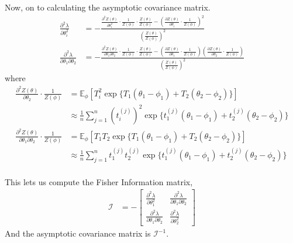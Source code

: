 \documentclass[11pt]{article}
\newcommand{\E}{\mathbb{E}}
\begin{document}
\begin{enumerate}
\begin{enumerate}
Now, on to calculating the asymptotic covariance matrix.
\begin{align*}
	\frac{\partial^2 \lambda}{\partial \theta_i^2} &= - \frac{ \frac{\partial^2 Z(\theta)}{\partial \theta_i^2} \cdot \frac{1}{Z(\phi)} \cdot \frac{Z(\theta)}{Z(\phi)} - \left(\frac{\partial Z(\theta)}{\partial \theta_i} \cdot \frac{1}{Z(\phi)}\right)^2 }{\left(\frac{Z(\theta)}{Z(\phi)}\right)^2} \\
	\frac{\partial^2 \lambda}{\partial \theta_1 \partial \theta_2} &= - \frac{ \frac{\partial^2 Z(\theta)}{\partial \theta_1 \partial \theta_2} \cdot \frac{1}{Z(\phi)} \cdot \frac{Z(\theta)}{Z(\phi)} - \left(\frac{\partial Z(\theta)}{\partial \theta_1} \cdot \frac{1}{Z(\phi)}\right) \left(\frac{\partial Z(\theta)}{\partial \theta_2} \cdot \frac{1}{Z(\phi)}\right) }{\left(\frac{Z(\theta)}{Z(\phi)}\right)^2}
\end{align*}
where
\begin{align*}
	\frac{\partial^2 Z(\theta)}{\partial \theta_2} \cdot \frac{1}{Z(\phi)} &= \E_{\phi} \left[ T_i^2 \exp\{T_1(\theta_1 - \phi_1) + T_2(\theta_2 - \phi_2)\} \right] \\
	&\approx \frac{1}{n} \sum_{j=1}^n (t_i^{(j)})^2 \exp\{t_1^{(j)}(\theta_1 - \phi_1) + t_2^{(j)} (\theta_2 - \phi_2)\} \\
	\frac{ \partial^2 Z(\theta) }{\partial \theta_1 \partial \theta_2} \cdot \frac{1}{Z(\phi)} &= \E_{\phi} \left[ T_1 T_2 \exp\{T_1(\theta_1 - \phi_1) + T_2(\theta_2 - \phi_2)\} \right] \\
	&\approx \frac{1}{n} \sum_{j=1}^n t_1^{(j)} t_2^{(j)} \exp\{t_1^{(j)}(\theta_1 - \phi_1) + t_2^{(j)} (\theta_2 - \phi_2)\} \\
\end{align*}

This lets us compute the Fisher Information matrix,
\begin{align*}
	\mathcal{I} &= - \begin{bmatrix}
	\frac{\partial^2 \lambda}{\partial \theta_1^2} & \frac{\partial^2 \lambda}{\partial \theta_1 \partial \theta_2} \\
	\frac{\partial^2 \lambda}{\partial \theta_1 \partial \theta_2} & \frac{\partial^2 \lambda}{\partial \theta_2^2}
	\end{bmatrix}
\end{align*}
And the asymptotic covariance matrix is $\mathcal{I}^{-1}$.



\end{enumerate}
\end{enumerate}
\end{document}
